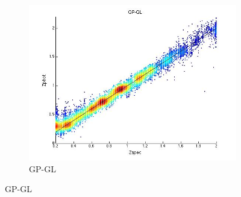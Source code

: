 \documentclass[useAMS,usenatbib,fleqn]{mn2e}
\begin{document}
\begin{figure}
\begin{subfigure}[b]{0.3\textwidth}
                \includegraphics[width=\textwidth]{figures/GPGL}
                \caption{GP-GL}
                \label{GPGL-plot}
        \end{subfigure}
        

\end{figure}
\end{document}
